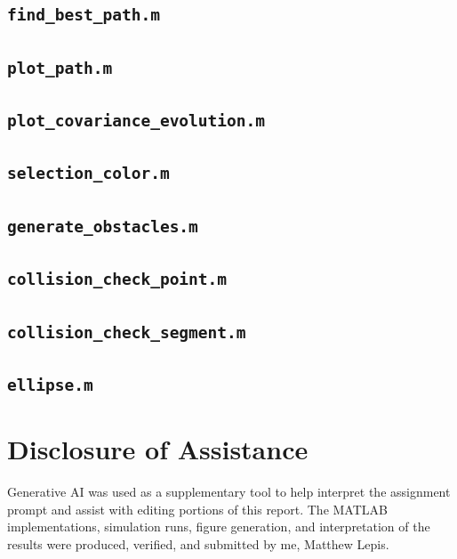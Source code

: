 \documentclass[11pt]{article}
\begin{document}
\subsection*{\texttt{find\_best\_path.m}}


\subsection*{\texttt{plot\_path.m}}


\subsection*{\texttt{plot\_covariance\_evolution.m}}


\subsection*{\texttt{selection\_color.m}}


\subsection*{\texttt{generate\_obstacles.m}}


\subsection*{\texttt{collision\_check\_point.m}}


\subsection*{\texttt{collision\_check\_segment.m}}


\subsection*{\texttt{ellipse.m}}


\section*{Disclosure of Assistance}
Generative AI was used as a supplementary tool to help interpret the assignment
prompt and assist with editing portions of this report. The MATLAB
implementations, simulation runs, figure generation, and interpretation of the
results were produced, verified, and submitted by me, Matthew Lepis.
\end{document}
